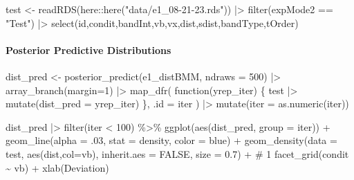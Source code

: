\documentclass[
  letterpaper,
  DIV=11,
  numbers=noendperiod]{scrartcl}
\let\oldparagraph\paragraph
\renewcommand{\paragraph}[1]{\oldparagraph{#1}\mbox{}}
\newenvironment{Shaded}{\begin{snugshade}}{\end{snugshade}}
\newcommand{\AttributeTok}[1]{\textcolor[rgb]{0.40,0.45,0.13}{#1}}
\newcommand{\CommentTok}[1]{\textcolor[rgb]{0.37,0.37,0.37}{#1}}
\newcommand{\ConstantTok}[1]{\textcolor[rgb]{0.56,0.35,0.01}{#1}}
\newcommand{\ControlFlowTok}[1]{\textcolor[rgb]{0.00,0.23,0.31}{#1}}
\newcommand{\DecValTok}[1]{\textcolor[rgb]{0.68,0.00,0.00}{#1}}
\newcommand{\FloatTok}[1]{\textcolor[rgb]{0.68,0.00,0.00}{#1}}
\newcommand{\FunctionTok}[1]{\textcolor[rgb]{0.28,0.35,0.67}{#1}}
\newcommand{\NormalTok}[1]{\textcolor[rgb]{0.00,0.23,0.31}{#1}}
\newcommand{\OtherTok}[1]{\textcolor[rgb]{0.00,0.23,0.31}{#1}}
\newcommand{\SpecialCharTok}[1]{\textcolor[rgb]{0.37,0.37,0.37}{#1}}
\newcommand{\StringTok}[1]{\textcolor[rgb]{0.13,0.47,0.30}{#1}}
\begin{document}
\begin{Shaded}
\begin{Highlighting}[]
\NormalTok{test }\OtherTok{\textless{}{-}} \FunctionTok{readRDS}\NormalTok{(here}\SpecialCharTok{::}\FunctionTok{here}\NormalTok{(}\StringTok{"data/e1\_08{-}21{-}23.rds"}\NormalTok{)) }\SpecialCharTok{|\textgreater{}} \FunctionTok{filter}\NormalTok{(expMode2 }\SpecialCharTok{==} \StringTok{"Test"}\NormalTok{)  }\SpecialCharTok{|\textgreater{}}
  \FunctionTok{select}\NormalTok{(id,condit,bandInt,vb,vx,dist,sdist,bandType,tOrder)}
\end{Highlighting}
\end{Shaded}

\paragraph{Posterior Predictive
Distributions}\label{posterior-predictive-distributions}

\begin{Shaded}
\begin{Highlighting}[]
\NormalTok{dist\_pred }\OtherTok{\textless{}{-}} 
  \FunctionTok{posterior\_predict}\NormalTok{(e1\_distBMM, }\AttributeTok{ndraws =} \DecValTok{500}\NormalTok{) }\SpecialCharTok{|\textgreater{}} 
  \FunctionTok{array\_branch}\NormalTok{(}\AttributeTok{margin=}\DecValTok{1}\NormalTok{) }\SpecialCharTok{|\textgreater{}} 
   \FunctionTok{map\_dfr}\NormalTok{( }
    \ControlFlowTok{function}\NormalTok{(yrep\_iter) \{}
\NormalTok{      test  }\SpecialCharTok{|\textgreater{}}
        \FunctionTok{mutate}\NormalTok{(}\AttributeTok{dist\_pred =}\NormalTok{ yrep\_iter)}
\NormalTok{    \},}
    \AttributeTok{.id =} \StringTok{\textquotesingle{}iter\textquotesingle{}}
\NormalTok{  ) }\SpecialCharTok{|\textgreater{}}
  \FunctionTok{mutate}\NormalTok{(}\AttributeTok{iter =} \FunctionTok{as.numeric}\NormalTok{(iter))}



\NormalTok{dist\_pred  }\SpecialCharTok{|\textgreater{}}
  \FunctionTok{filter}\NormalTok{(iter }\SpecialCharTok{\textless{}} \DecValTok{100}\NormalTok{) }\SpecialCharTok{\%\textgreater{}\%}
  \FunctionTok{ggplot}\NormalTok{(}\FunctionTok{aes}\NormalTok{(dist\_pred, }\AttributeTok{group =}\NormalTok{ iter)) }\SpecialCharTok{+}
  \FunctionTok{geom\_line}\NormalTok{(}\AttributeTok{alpha =}\NormalTok{ .}\DecValTok{03}\NormalTok{, }\AttributeTok{stat =} \StringTok{\textquotesingle{}density\textquotesingle{}}\NormalTok{, }\AttributeTok{color =} \StringTok{\textquotesingle{}blue\textquotesingle{}}\NormalTok{) }\SpecialCharTok{+}
  \FunctionTok{geom\_density}\NormalTok{(}\AttributeTok{data =}\NormalTok{ test,}
               \FunctionTok{aes}\NormalTok{(dist,}\AttributeTok{col=}\NormalTok{vb),}
               \AttributeTok{inherit.aes =} \ConstantTok{FALSE}\NormalTok{,}
               \AttributeTok{size =} \FloatTok{0.7}\NormalTok{) }\SpecialCharTok{+} \CommentTok{\# 1}
  \FunctionTok{facet\_grid}\NormalTok{(condit }\SpecialCharTok{\textasciitilde{}}\NormalTok{ vb) }\SpecialCharTok{+}
  \FunctionTok{xlab}\NormalTok{(}\StringTok{\textquotesingle{}Deviation\textquotesingle{}}\NormalTok{)}
\end{Highlighting}
\end{Shaded}
\end{document}

